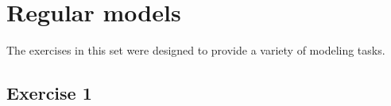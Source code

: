 \documentclass{article}
\newenvironment{code}{}{}
\begin{document}
\begin{comment}
    And here is an  SQL representation for the simple bicycle model.
\begin{code}
\begin{verbatim}
CREATE TABLE BICYCLE
  ( FRAME        CHAR(50) NOT NULL,
    SEAT         CHAR(50) NOT NULL,
    HANDLEBAR    CHAR(50) NOT NULL,
    LEFT_PEDAL   CHAR(50) NOT NULL,
    RIGHT_PEDAL  CHAR(50) NOT NULL,
    FRONT_WHEEL  CHAR(50) NOT NULL,
    LEFT_WHEEL   CHAR(50) NOT NULL,
    PRIMARY KEY (FRAME),
    FOREIGN KEY (FRAME) REFERENCES FRAME (ID),
    FOREIGN KEY (SEAT) REFERENCES SADDLE (ID),
    FOREIGN KEY (HANDLEBAR) REFERENCES HANDLEBAR (ID),
    FOREIGN KEY (LEFT_PEDAL) REFERENCES PEDAL (ID),
    FOREIGN KEY (RIGHT_PEDAL) REFERENCES PEDAL (ID),
    FOREIGN KEY (FRONT_WHEEEL) REFERENCES WHEEL (ID),
    FOREIGN KEY (REAR_WHEEL) REFERENCES WHEEL (ID) )

CREATE TABLE FRAME
  ( ID          CHAR(50),
    PRIMARY KEY (ID) )

CREATE TABLE SADDLE
  ( ID          CHAR(50),
    PRIMARY KEY (ID) )

CREATE TABLE HANDLEBAR
  ( ID          CHAR(50),
    PRIMARY KEY (ID) )

CREATE TABLE PEDAL
  ( ID          CHAR(50),
    PRIMARY KEY (ID) )

CREATE TABLE WHEEL
  ( ID          CHAR(50),
    PRIMARY KEY (ID) )
\end{verbatim}
\end{code}

\end{comment}


\clearpage

\section{Regular models} 

    The exercises in this set were designed to provide a variety of
modeling tasks.

\subsection{Exercise 1}
\end{document}
